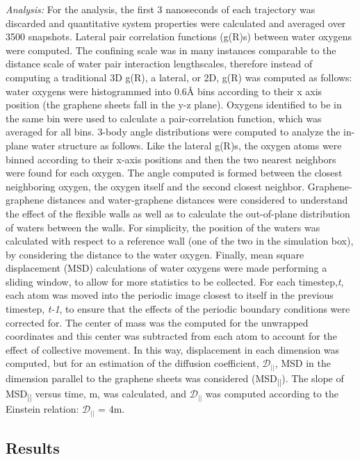 \documentclass[12pt]{article}
\begin{document}
\textit{Analysis:} For the analysis, the first 3 nanoseconds of each trajectory was discarded and quantitative system properties were calculated and averaged over 3500 snapshots. Lateral pair correlation functions (g(R)s) between water oxygens were computed. The confining scale was in many instances comparable to the distance scale of water pair interaction lengthscales, therefore instead of computing a traditional 3D g(R), a lateral, or 2D, g(R) was computed as follows: water oxygens were histogrammed into 0.6\r A bins according to their x axis position (the graphene sheets fall in the y-z plane). Oxygens identified to be in the same bin were used to calculate a pair-correlation function, which was averaged for all bins. 3-body angle distributions were computed to analyze the in-plane water structure as follows. Like the lateral g(R)s, the oxygen atoms were binned according to their x-axis positions and then the two nearest neighbors were found for each oxygen. The angle computed is formed between the closest neighboring oxygen, the oxygen itself and the second closest neighbor. Graphene-graphene distances and water-graphene distances were considered to understand the effect of the flexible walls as well as to calculate the out-of-plane distribution of waters between the walls. For simplicity, the position of the waters was calculated with respect to a reference wall (one of the two in the simulation box), by considering the distance to the water oxygen. Finally, mean square displacement (MSD) calculations of water oxygens were made performing a sliding window, to allow for more statistics to be collected. For each timestep,\textit{t}, each atom was moved into the periodic image closest to itself in the previous timestep, \textit{t-1}, to ensure that the effects of the periodic boundary conditions were corrected for. The center of mass was the computed for the unwrapped coordinates and this center was subtracted from each atom to account for the effect of collective movement. In this way, displacement in each dimension was computed, but for an estimation of the diffusion coefficient, \(\mathcal{D}_{||}\), MSD in the dimension parallel to the graphene sheets was considered (MSD\textsubscript{||}). The slope of MSD\textsubscript{||} versus time, m, was calculated, and \(\mathcal{D}_{||}\) was computed according to the Einstein relation: \(\mathcal{D}_{||}\) = 4m.

\subsection*{Results}
\end{document}
